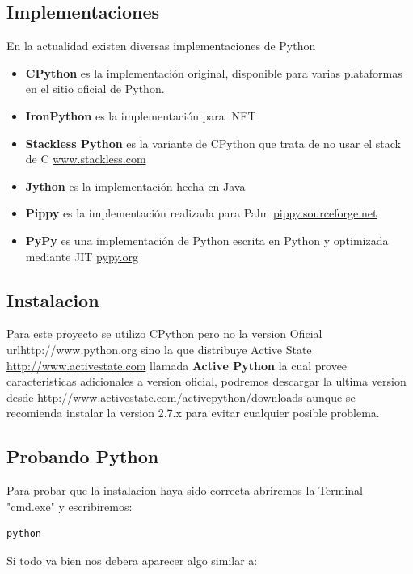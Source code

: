 \subsection{Implementaciones}

En la actualidad existen diversas implementaciones de Python

\begin{itemize}
    \item {\bfseries CPython} es la implementación original, disponible para varias plataformas en el sitio oficial de Python.
    \item {\bfseries IronPython} es la implementación para .NET
    \item {\bfseries Stackless Python} es la variante de CPython que trata de no usar el stack de C \url{www.stackless.com}
    \item {\bfseries Jython} es la implementación hecha en Java
    \item {\bfseries Pippy} es la implementación realizada para Palm \url{pippy.sourceforge.net}
    \item {\bfseries PyPy} es una implementación de Python escrita en Python y optimizada mediante JIT \url{pypy.org}
\end{itemize}

\subsection{Instalacion}

Para este proyecto se utilizo CPython pero no la version Oficial url{http://www.python.org}
sino la que distribuye Active State \url{http://www.activestate.com} llamada
{\bfseries Active Python} la cual provee caracteristicas adicionales a version oficial,
podremos descargar la ultima version desde \url{http://www.activestate.com/activepython/downloads}
aunque se recomienda instalar la version 2.7.x para evitar cualquier posible problema.

\subsection{Probando Python}
Para probar que la instalacion haya sido correcta abriremos la Terminal "cmd.exe"
y escribiremos:

\begin{lstlisting}[style=consola, numbers=none]
    python
\end{lstlisting} 

Si todo va bien nos debera aparecer algo similar a:

